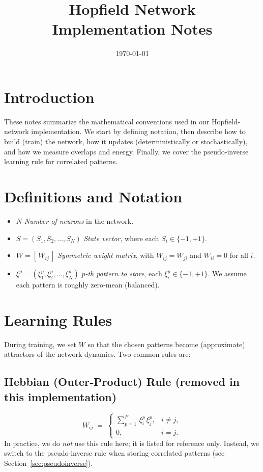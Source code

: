 \documentclass{article}
\title{Hopfield Network\\Implementation Notes}
\author{ }
\date{\today}
\begin{document}
\maketitle

\section{Introduction}
These notes summarize the mathematical conventions used in our Hopfield‐network implementation.  We start by defining notation, then describe how to build (train) the network, how it updates (deterministically or stochastically), and how we measure overlaps and energy.  Finally, we cover the pseudo‐inverse learning rule for correlated patterns.

\section{Definitions and Notation}
\begin{itemize}
    \item $N$ \quad\textit{Number of neurons} in the network.
    \item $\displaystyle S = (S_1, S_2, \dots, S_N)$ \quad\textit{State vector}, where each $S_i \in \{ -1, +1 \}$.
    \item $\displaystyle W = [\,W_{ij}\,]$ \quad\textit{Symmetric weight matrix}, with $W_{ij} = W_{ji}$ and $W_{ii} = 0$ for all $i$.
    \item $\displaystyle \xi^p = (\xi_1^p, \xi_2^p, \dots, \xi_N^p)$ \quad\textit{$p$-th pattern to store}, each $\xi_i^p \in \{-1,+1\}$.  We assume each pattern is roughly zero‐mean (balanced).
\end{itemize}

\section{Learning Rules}
During training, we set $W$ so that the chosen patterns become (approximate) attractors of the network dynamics.  Two common rules are:

\subsection{Hebbian (Outer‐Product) Rule (removed in this implementation)}
\[
W_{ij}
\;=\;
\begin{cases}
\displaystyle
\sum_{p=1}^{P} \,\xi_i^p\,\xi_j^p, 
& i \neq j,\\[1em]
0, 
& i = j.
\end{cases}
\]
In practice, we do \emph{not} use this rule here; it is listed for reference only.  Instead, we switch to the pseudo‐inverse rule when storing correlated patterns (see Section~\ref{sec:pseudoinverse}).
\end{document}
